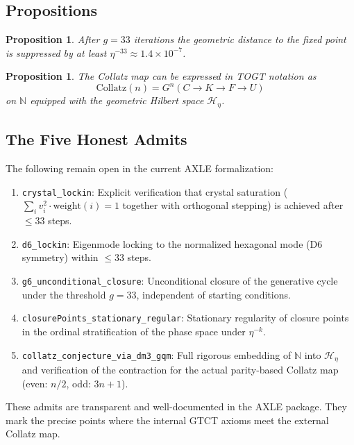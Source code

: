 \documentclass[11pt,a4paper]{article}
\newtheorem{proposition}[theorem]{Proposition}
\theoremstyle{definition}
\theoremstyle{remark}
\begin{document}
\subsection{Propositions}

\begin{proposition}
After $g=33$ iterations the geometric distance to the fixed point is suppressed by at least
$\eta^{-33}\approx1.4\times10^{-7}$.
\end{proposition}

\begin{proposition}
The Collatz map can be expressed in TOGT notation as
\[
  \mathrm{Collatz}(n)=G^n(C\to K\to F\to U)
\]
on $\mathbb{N}$ equipped with the geometric Hilbert space $\mathcal{H}_\eta$.
\end{proposition}

\subsection{The Five Honest Admits}

The following remain open in the current AXLE formalization:

\begin{enumerate}
  \item[\textbf{Admit 1}] \texttt{crystal\_lockin}: Explicit verification that crystal
  saturation ($\sum_i v_i^2\cdot\mathrm{weight}(i)=1$ together with orthogonal stepping) is
  achieved after $\le33$ steps.
  \item[\textbf{Admit 2}] \texttt{d6\_lockin}: Eigenmode locking to the normalized hexagonal
  mode (D6 symmetry) within $\le33$ steps.
  \item[\textbf{Admit 3}] \texttt{g6\_unconditional\_closure}: Unconditional closure of the
  generative cycle under the threshold $g=33$, independent of starting conditions.
  \item[\textbf{Admit 4}] \texttt{closurePoints\_stationary\_regular}: Stationary regularity
  of closure points in the ordinal stratification of the phase space under $\eta^{-k}$.
  \item[\textbf{Admit 5}] \texttt{collatz\_conjecture\_via\_dm3\_gqm}: Full rigorous embedding
  of $\mathbb{N}$ into $\mathcal{H}_\eta$ and verification of the contraction for the actual
  parity-based Collatz map (even: $n/2$, odd: $3n+1$).
\end{enumerate}

These admits are transparent and well-documented in the AXLE package. They mark the precise
points where the internal GTCT axioms meet the external Collatz map.
\end{document}
